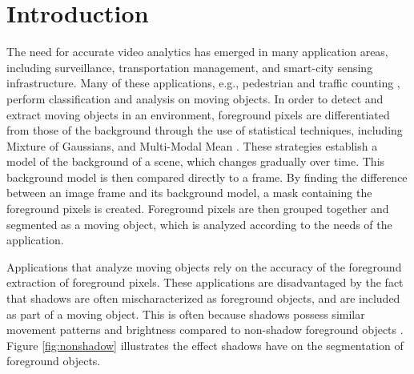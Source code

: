 \clearpage

\def\bsq#1{
\lq{#1}\rq}

\chapter{Introduction}

The need for accurate video analytics has emerged in many application areas, including surveillance, transportation management, and smart-city sensing infrastructure. Many of these applications, e.g., pedestrian and traffic counting \cite{danner2016rapid}, perform classification and analysis on moving objects. In order to detect and extract moving objects in an environment, foreground pixels are differentiated from those of the background through the use of statistical techniques, including Mixture of Gaussians, and Multi-Modal Mean \cite{stauffer1999adaptive, apewokin2007multimodal}. These strategies establish a model of the background of a scene, which changes gradually over time. This background model is then compared directly to a frame. By finding the difference between an image frame and its background model, a mask containing the foreground pixels is created. Foreground pixels are then grouped together and segmented as a moving object, which is analyzed according to the needs of the application.

Applications that analyze moving objects rely on the accuracy of the foreground extraction of foreground pixels. These applications are disadvantaged by the fact that shadows are often mischaracterized as foreground objects, and are included as part of a moving object. This is often because shadows possess similar movement patterns and brightness compared to non-shadow foreground objects \cite{nadimi2004physical}. Figure \ref{fig:nonshadow} illustrates the effect shadows have on the segmentation of foreground objects. 

